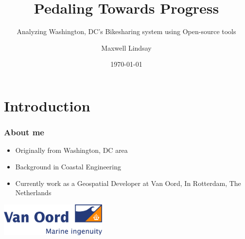\documentclass{beamer}
\title{Pedaling Towards Progress}
\subtitle{Analyzing Washington, DC's Bikesharing system using Open-source tools}
\author{Maxwell Lindsay}
\institute{Van Oord}
\date{\today}
\begin{document}
\begin{frame}
    \titlepage
\end{frame}
\section{Introduction}
\begin{frame}
    \frametitle{About me}
    \begin{itemize}
        \item Originally from Washington, DC area
        \item Background in Coastal Engineering
        \item Currently work as a Geospatial Developer at Van Oord, In Rotterdam, The Netherlands
    \end{itemize}
    \begin{center}
        \includegraphics[width=0.4\textwidth]{VO_logo.png}
    \end{center}
\end{frame}
\end{document}
